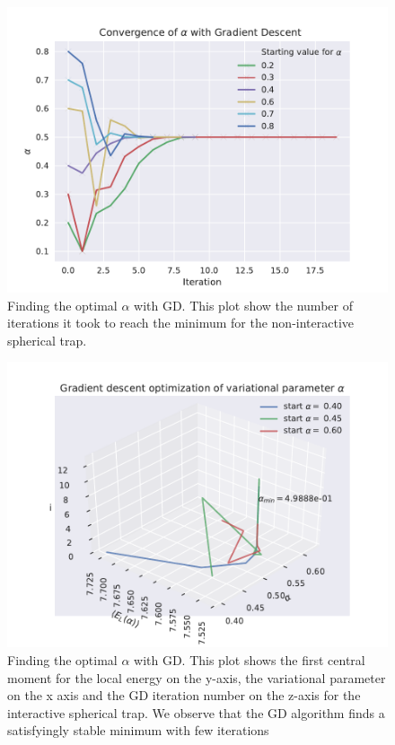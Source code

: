\begin{figure}
\includegraphics{figures/GD_NM_NIA.pdf}
\caption{Finding the optimal $\alpha$ with GD. This plot show the number of iterations it took to reach the minimum for the non-interactive spherical trap.}\label{fig:gd_nm_nia}
\end{figure} 

\begin{figure}
\includegraphics{figures/GD_NM_IA.pdf}
\caption{Finding the optimal $\alpha$ with GD. This plot shows the first central moment for the local energy on the y-axis, the variational parameter on the x axis and the GD iteration number on the z-axis for the interactive spherical trap. We observe that the GD algorithm finds a satisfyingly stable minimum with few iterations}\label{fig:gd_nm_ia}
\end{figure} 

